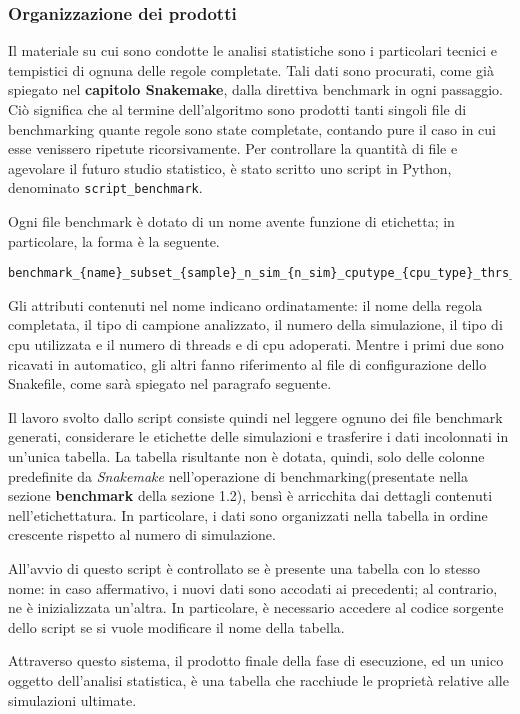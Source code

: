\subsubsection{Organizzazione dei prodotti}
Il materiale su cui sono condotte le analisi statistiche sono i particolari tecnici e tempistici di ognuna delle regole completate.
Tali dati sono procurati, come già spiegato nel \textbf{capitolo Snakemake}, dalla direttiva benchmark in ogni passaggio.
Ciò significa che al termine dell'algoritmo sono prodotti tanti singoli file di benchmarking quante regole sono state completate, contando pure il caso in cui esse venissero ripetute ricorsivamente.
Per controllare la quantità di file e agevolare il futuro studio statistico, è stato scritto uno script in Python, denominato \verb!script_benchmark!.


Ogni file benchmark è dotato di un nome avente funzione di etichetta; in particolare, la forma è la seguente.
\begin{lstlisting}
benchmark_{name}_subset_{sample}_n_sim_{n_sim}_cputype_{cpu_type}_thrs_{thrs}_ncpu{n_cpu}.txt
\end{lstlisting}
Gli attributi contenuti nel nome indicano ordinatamente: il nome della regola completata, il tipo di campione analizzato, il numero della simulazione, il tipo di cpu utilizzata e il numero di threads e di cpu adoperati.
Mentre i primi due sono ricavati in automatico, gli altri fanno riferimento al file di configurazione dello Snakefile, come sarà spiegato nel paragrafo seguente.

Il lavoro svolto dallo script consiste quindi nel leggere ognuno dei file benchmark generati, considerare le etichette delle simulazioni e trasferire i dati incolonnati in un'unica tabella.
La tabella risultante non è dotata, quindi, solo delle colonne predefinite da \textit{Snakemake} nell'operazione di benchmarking(presentate nella sezione \textbf{benchmark} della sezione 1.2), bensì è arricchita dai dettagli contenuti nell'etichettatura.
In particolare, i dati sono organizzati nella tabella in ordine crescente rispetto al numero di simulazione.

All'avvio di questo script è controllato se è presente una tabella con lo stesso nome: in caso affermativo, i nuovi dati sono accodati ai precedenti; al contrario, ne è inizializzata un'altra.
In particolare, è necessario accedere al codice sorgente dello script se si vuole modificare il nome della tabella.

Attraverso questo sistema, il prodotto finale della fase di esecuzione, ed un unico oggetto dell'analisi statistica, è una tabella che racchiude le proprietà relative alle simulazioni ultimate.


